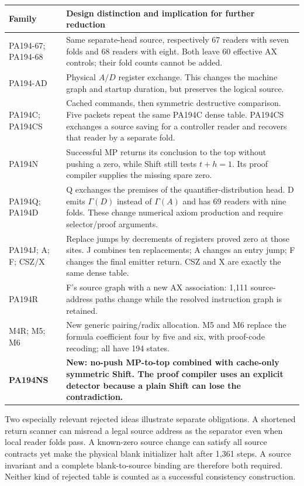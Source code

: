 \documentclass[11pt,letterpaper]{article}
\begin{document}
\begin{center}\small
\begin{tabularx}{\linewidth}{@{}lX@{}}
\toprule
Family & Design distinction and implication for further reduction\\\midrule
PA194-67; PA194-68 & Same separate-head source, respectively 67 readers with seven folds and 68 readers with eight. Both leave 60 effective AX controls; their fold counts cannot be added.\\
PA194-AD & Physical $A/D$ register exchange. This changes the machine graph and startup duration, but preserves the logical source.\\
PA194C; PA194CS & Cached commands, then symmetric destructive comparison. Five packets repeat the same PA194C dense table. PA194CS exchanges a source saving for a controller reader and recovers that reader by a separate fold.\\
PA194N & Successful MP returns its conclusion to the top without pushing a zero, while Shift still tests $t+h=1$. Its proof compiler supplies the missing spare zero.\\
PA194Q; PA194D & Q exchanges the premises of the quantifier-distribution head. D emits $\Gamma(D)$ instead of $\Gamma(A)$ and has 69 readers with nine folds. These change numerical axiom production and require selector/proof arguments.\\
PA194J; A; F; CSZ/X & Replace jumps by decrements of registers proved zero at those sites. J combines ten replacements; A changes an entry jump; F changes the final emitter return. CSZ and X are exactly the same dense table.\\
PA194R & F's source graph with a new AX association: 1,111 source-address paths change while the resolved instruction graph is retained.\\
M4R; M5; M6 & New generic pairing/radix allocation. M5 and M6 replace the formula coefficient four by five and six, with proof-code recoding; all have 194 states.\\
\textbf{PA194NS} & \textbf{New: no-push MP-to-top combined with cache-only symmetric Shift. The proof compiler uses an explicit detector because a plain Shift can lose the contradiction.}\\
\bottomrule
\end{tabularx}
\end{center}

Two especially relevant rejected ideas illustrate separate obligations.
A shortened return scanner can misread a legal source address as the
separator even when local reader folds pass. A known-zero source change
can satisfy all source contracts yet make the physical blank initializer
halt after 1,361 steps. A source invariant and a complete blank-to-source
binding are therefore both required. Neither kind of rejected table is
counted as a successful consistency construction.
\end{document}
